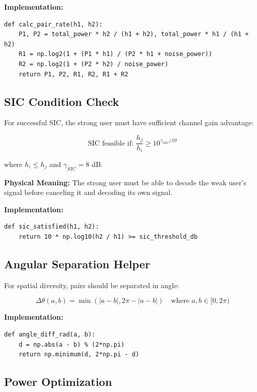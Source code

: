 \documentclass[12pt,a4paper]{article}
\begin{document}
\textbf{Implementation:}
\begin{lstlisting}[caption={SIC Rate Calculation}]
def calc_pair_rate(h1, h2):
    P1, P2 = total_power * h2 / (h1 + h2), total_power * h1 / (h1 + h2)
    R1 = np.log2(1 + (P1 * h1) / (P2 * h1 + noise_power))
    R2 = np.log2(1 + (P2 * h2) / noise_power)
    return P1, P2, R1, R2, R1 + R2
\end{lstlisting}

\subsection{SIC Condition Check}

For successful SIC, the strong user must have sufficient channel gain advantage:

\begin{equation}
\text{SIC feasible if: } \frac{h_j}{h_i} \geq 10^{\gamma_{SIC}/10}
\end{equation}

where $h_i \leq h_j$ and $\gamma_{SIC} = 8$ dB.

\textbf{Physical Meaning:} The strong user must be able to decode the weak user's signal before canceling it and decoding its own signal.

\textbf{Implementation:}
\begin{lstlisting}[caption={SIC Feasibility Check}]
def sic_satisfied(h1, h2):
    return 10 * np.log10(h2 / h1) >= sic_threshold_db
\end{lstlisting}

\subsection{Angular Separation Helper}

For spatial diversity, pairs should be separated in angle:

\begin{equation}
\Delta\theta(a, b) = \min(|a - b|, 2\pi - |a - b|) \quad \text{where } a, b \in [0, 2\pi)
\end{equation}

\textbf{Implementation:}
\begin{lstlisting}[caption={Angular Difference Calculation}]
def angle_diff_rad(a, b):
    d = np.abs(a - b) % (2*np.pi)
    return np.minimum(d, 2*np.pi - d)
\end{lstlisting}

\subsection{Power Optimization}
\end{document}
